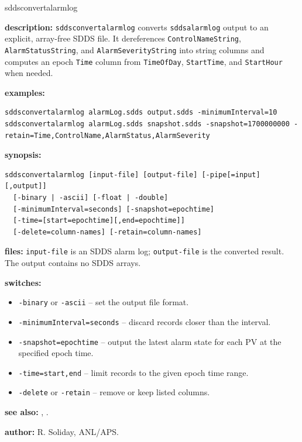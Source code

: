 \begin{sddsprog}{sddsconvertalarmlog}
  \item \textbf{description:} \verb|sddsconvertalarmlog| converts \verb|sddsalarmlog| output to an explicit, array-free SDDS file. It dereferences \verb|ControlNameString|, \verb|AlarmStatusString|, and \verb|AlarmSeverityString| into string columns and computes an epoch \verb|Time| column from \verb|TimeOfDay|, \verb|StartTime|, and \verb|StartHour| when needed.
  \item \textbf{examples:}
    \begin{verbatim}
sddsconvertalarmlog alarmLog.sdds output.sdds -minimumInterval=10
sddsconvertalarmlog alarmLog.sdds snapshot.sdds -snapshot=1700000000 -retain=Time,ControlName,AlarmStatus,AlarmSeverity
    \end{verbatim}
  \item \textbf{synopsis:}
    \begin{verbatim}
sddsconvertalarmlog [input-file] [output-file] [-pipe[=input][,output]]
  [-binary | -ascii] [-float | -double]
  [-minimumInterval=seconds] [-snapshot=epochtime]
  [-time=[start=epochtime][,end=epochtime]]
  [-delete=column-names] [-retain=column-names]
    \end{verbatim}
  \item \textbf{files:} \verb|input-file| is an SDDS alarm log; \verb|output-file| is the converted result. The output contains no SDDS arrays.
  \item \textbf{switches:}
    \begin{itemize}
      \item \verb|-binary| or \verb|-ascii| -- set the output file format.
      \item \verb|-minimumInterval=seconds| -- discard records closer than the interval.
      \item \verb|-snapshot=epochtime| -- output the latest alarm state for each PV at the specified epoch time.
      \item \verb|-time=start,end| -- limit records to the given epoch time range.
      \item \verb|-delete| or \verb|-retain| -- remove or keep listed columns.
    \end{itemize}
  \item \textbf{see also:} , .
  \item \textbf{author:} R. Soliday, ANL/APS.
\end{sddsprog}
